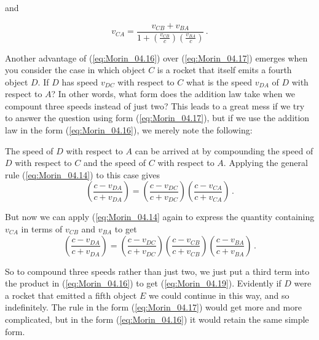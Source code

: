 and 

\begin{equation}\label{eq:Morin_04.17}
v_{CA} = \frac{v_{CB} + v_{BA}}{1 + \left(\frac{v_{CB}}{c}\right) \left(\frac{v_{BA}}{c}\right)}\,.
\end{equation}

Another advantage of (\ref{eq:Morin_04.16}) over (\ref{eq:Morin_04.17}) emerges when you consider the case in which object $C$ is a rocket that itself emits a fourth object $D$. If $D$ has speed $v_{DC}$ with respect to $C$ what is the speed $v_{DA}$ of $D$ with respect to $A$? In other words, what form does the addition law take when we compount three speeds instead of just two? This leads to a great mess if we try to answer the question using form (\ref{eq:Morin_04.17}), but if we use the addition law in the form (\ref{eq:Morin_04.16}), we merely note the following:

The speed of $D$ with respect to $A$ can be arrived at by compounding the speed of $D$ with respect to $C$ and the speed of $C$ with respect to $A$. Applying the general rule (\ref{eq:Morin_04.14}) to this case gives 
\begin{equation}\label{eq:Morin_04.18}
\left( \frac{c - v_{DA}}{c + v_{DA}} \right) = \left( \frac{c - v_{DC}}{c + v_{DC}} \right)  \left( \frac{c - v_{CA}}{c + v_{CA}} \right)\,.
\end{equation}

But now we can apply (\ref{eq:Morin_04.14} again to express the quantity containing $v_{CA}$ in terms of $v_{CB}$ and $v_{BA}$ to get
\begin{equation}\label{eq:Morin_04.19}
\left( \frac{c - v_{DA}}{c + v_{DA}} \right) = \left( \frac{c - v_{DC}}{c + v_{DC}} \right)  \left( \frac{c - v_{CB}}{c + v_{CB}} \right) \left( \frac{c - v_{BA}}{c + v_{BA}} \right) \,.
\end{equation}

So to compound three speeds rather than just two, we just put a third term into the product in (\ref{eq:Morin_04.16}) to get (\ref{eq:Morin_04.19}). Evidently if $D$ were a rocket that emitted a fifth object $E$ we could continue in this way, and so indefinitely. The rule in the form (\ref{eq:Morin_04.17}) would get more and more complicated, but in the form (\ref{eq:Morin_04.16}) it would retain the same simple form.

